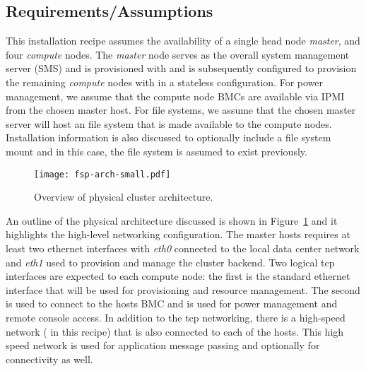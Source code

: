 \subsection{Requirements/Assumptions}
This installation recipe assumes the availability of a single head node {\em
master}, and four {\em compute} nodes. The {\em master} node serves as the
overall system management server (SMS) and is provisioned with \baseOS{} and is
subsequently configured to provision the remaining {\em compute} nodes with
\Warewulf{} in a stateless configuration. For power management, we assume that the
compute node BMCs are available via IPMI from the chosen master host. For file
systems, we assume that the chosen master server will host an \NFS{} file
system that is made available to the compute nodes. Installation information is
also discussed to optionally include a \Lustre{} file system mount and in this
case, the \Lustre{} file system is assumed to exist previously. 

\begin{figure}[hbt]
\center
\texttt{[image: fsp-arch-small.pdf]}
\vspace*{-0.2cm}
\caption{Overview of physical cluster architecture.} \label{fig:physical_arch}
\end{figure}
\mbox{}

An outline of the physical architecture discussed is shown in
Figure~\ref{fig:physical_arch} and it highlights the high-level networking
configuration. The master hosts requires at least two ethernet interfaces with
{\em eth0} connected to the local data center network and {\em eth1} used to
provision and manage the cluster backend.  Two logical tcp interfaces are
expected to each compute node: the first is the standard ethernet interface
that will be used for provisioning and resource management. The second is
used to connect to the hosts BMC and is used for power management and
remote console access.  In addition to the tcp networking, there is a
high-speed network (\InfiniBand{} in this recipe) that is also connected to
each of the hosts. This high speed network is used for application message
passing and optionally for \Lustre{} connectivity as well.

